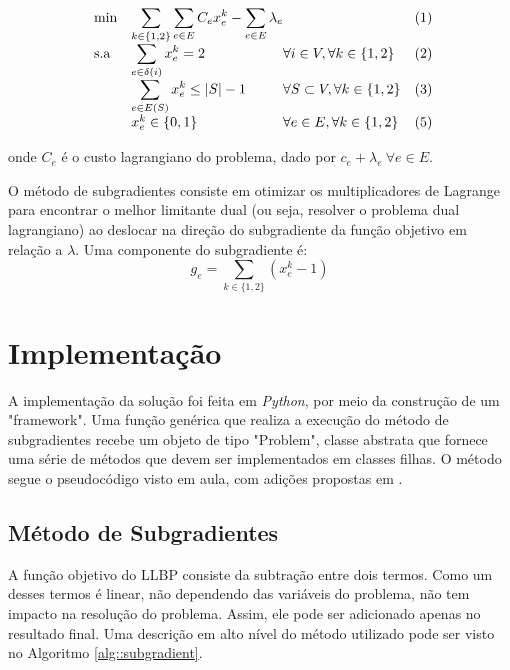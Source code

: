 \documentclass{TEMA}
\begin{document}
    \begin{equation*}
    \begin{array}{ll@{}ll@{}ll}
    \text{min}  & \displaystyle\sum\limits_{k \in \{1,2\}}\sum\limits_{e \in E} C_{e}x_{e}^k - \sum\limits_{e \in E} \lambda_e & &(1)\\
    \text{s.a}       & \displaystyle\sum\limits_{e \in \delta(i)} x_{e}^k = 2 & \forall i \in V,                        \forall k \in \{1,2\} &(2)\\
                     & \displaystyle\sum\limits_{e \in E(S)} x_{e}^k \leq |S|-1 & \forall S \subset V, \forall k \in \{1,2\} &(3)\\
                     & x_{e}^k \in \{0,1\} & \forall e \in E, \forall k \in \{1,2\} &(5)\\
    \end{array}
    \end{equation*}
    
    onde $C_e$ é o custo lagrangiano do problema, dado por $c_e + \lambda_e~\forall e \in E$.
    
    O método de subgradientes consiste em otimizar os multiplicadores de Lagrange para encontrar o melhor limitante dual (ou seja, resolver o problema dual lagrangiano) ao deslocar na direção do subgradiente da função objetivo em relação a $\lambda$. Uma componente do subgradiente é:
    \begin{equation*}
        \tag{GRAD}
        g_e = \displaystyle\sum\limits_{k \in \{1,2\}} (x_{e}^k - 1)
        \label{eqn::grad}
    \end{equation*}

\section{Implementação} \label{imp}

A implementação da solução foi feita em \emph{Python}, por meio da construção de um "framework". Uma função genérica que realiza a execução do método de subgradientes recebe um objeto de tipo "Problem", classe abstrata que fornece uma série de métodos que devem ser implementados em classes filhas. O método segue o pseudocódigo visto em aula, com adições propostas em \cite{beasley}.

\subsection{Método de Subgradientes}
A função objetivo do LLBP consiste da subtração entre dois termos. Como um desses termos é linear, não dependendo das variáveis do problema, não tem impacto na resolução do problema. Assim, ele pode ser adicionado apenas no resultado final. Uma descrição em alto nível do método utilizado pode ser visto no Algoritmo \ref{alg::subgradient}.
\end{document}
